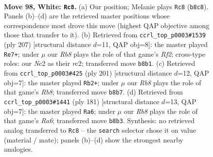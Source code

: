 \documentclass[11pt]{article}
\begin{document}
\clearpage

\begin{figure}[p]\centering
\begin{subfigure}{0.46\textwidth}\centering
\resizebox{\linewidth}{!}{%
\newchessgame
\chessboard[
  setfen={1R6/6pk/5p2/7p/7P/6PK/2Nr4/8 w - - 20 98},
  showmover=false,
  pgfstyle=straightmove, color=movearrow, markmove={b8-c8}
]}
\caption{}
\end{subfigure}\hfill
\begin{subfigure}{0.46\textwidth}\centering
\resizebox{\linewidth}{!}{%
\newchessgame
\chessboard[
  setfen={8/5r2/6pk/7p/7P/4KPP1/2R5/8 b - - 75 104},
  showmover=false,
  pgfstyle=straightmove, color=movearrow, markmove={f7-e7}
]}
\caption{}
\end{subfigure}
\\[4pt]
\begin{subfigure}{0.46\textwidth}\centering
\resizebox{\linewidth}{!}{%
\newchessgame
\chessboard[
  setfen={8/5pk1/R6p/5P2/6P1/5P2/5K2/1r6 b - - 88 101},
  showmover=false,
  pgfstyle=straightmove, color=movearrow, markmove={b1-b2}
]}
\caption{}
\end{subfigure}\hfill
\begin{subfigure}{0.46\textwidth}\centering
\resizebox{\linewidth}{!}{%
\newchessgame
\chessboard[
  setfen={8/3R4/5kp1/7p/7P/r4PP1/5K2/8 b - - 30 91},
  showmover=false,
  pgfstyle=straightmove, color=movearrow, markmove={a3-a6}
]}
\caption{}
\end{subfigure}
\caption{\textbf{Move 98, White: \texttt{Rc8}.} (a) Our position; Melanie plays \texttt{Rc8} (\texttt{b8c8}). Panels (b)--(d) are the retrieved master positions whose correspondence most drove this move (highest QAP objective among those that transfer to it). (b) Retrieved from \texttt{ccrl\_top\_p0003\#1539} (ply 207) [structural distance $d$=11, QAP obj=8]: the master played \texttt{Re7+}; under $\mu$ our \emph{Rb8} plays the role of that game's \emph{Rf2}; cross-type roles: our \emph{N}c2 as their \emph{r}c2; transferred move \texttt{b8b1}. (c) Retrieved from \texttt{ccrl\_top\_p0003\#425} (ply 201) [structural distance $d$=12, QAP obj=7]: the master played \texttt{Rb2+}; under $\mu$ our \emph{Rb8} plays the role of that game's \emph{Rb8}; transferred move \texttt{b8b7}. (d) Retrieved from \texttt{ccrl\_top\_p0003\#1441} (ply 181) [structural distance $d$=13, QAP obj=7]: the master played \texttt{Ra6}; under $\mu$ our \emph{Rb8} plays the role of that game's \emph{Ra6}; transferred move \texttt{b8b3}. Synthesis: no retrieved analog transferred to \texttt{Rc8} -- the \texttt{search} selector chose it on value (material / mate); panels (b)--(d) show the strongest nearby analogies.}
\label{fig:thought-m194}
\end{figure}
\end{document}
